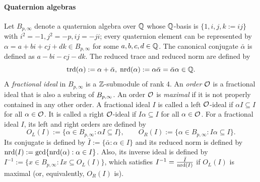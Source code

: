 
\paragraph{Quaternion algebras}

Let $B_{p, \infty}$ denote a quaternion algebra over $\mathbb{Q}$
whose $\mathbb{Q}$-basis is $\{1, i, j, k:=ij\}$ with $i^2=-1, j^2=-p, ij=-ji$;
every quaternion element can be represented by $\alpha = a + b i +cj+dk \in B_{p,\infty}$ for some $a,b,c,d \in \mathbb{Q}$.
The canonical conjugate $\bar{\alpha}$ is defined as $a- bi-cj-dk$.
The reduced trace and reduced norm are defined by
$$
    \mathrm{trd}(\alpha):=\alpha + \bar{\alpha}, \; \mathrm{nrd}(\alpha):=\alpha \bar{\alpha} = \bar{\alpha}\alpha \in \mathbb{Q}.
$$
A \textit{fractional ideal} in $B_{p,\infty}$ is a $\mathbb{Z}$-submodule of rank 4.
An \textit{order} $\mathcal{O}$ is a fractional ideal that is also a subring of $B_{p,\infty}$.
An order $\mathcal{O}$ is \textit{maximal} if it is not properly contained in any other order. A fractional ideal $I$ is called a left $\mathcal{O}$-ideal if $\alpha I \subseteq I$ for all $\alpha \in \mathcal{O}$. It is called a right $\mathcal{O}$-ideal if $I \alpha \subseteq I$ for all $\alpha \in \mathcal{O}$.
For a fractional ideal \(I\), its left and right orders are defined by
\[
O_L(I):=\{\alpha\in B_{p,\infty}:\alpha I\subseteq I\},
\qquad
O_R(I):=\{\alpha\in B_{p,\infty}:I\alpha\subseteq I\}.
\]
Its conjugate is defined by $\bar{I} := \{\bar{\alpha} : \alpha\in I\}$ and its reduced norm is defined by $\mathrm{nrd}(I) := \gcd\{\mathrm{nrd}(\alpha) : \alpha\in I\}$.
Also, its inverse ideal is defined by $I^{-1}:=\{x\in B_{p,\infty}: Ix\subseteq O_L(I)\}$, which satisfies $I^{-1}=\frac{\bar{I}}{\mathrm{nrd}(I)}$ if $O_L(I)$ is maximal (or, equivalently, $O_R(I)$ is).

